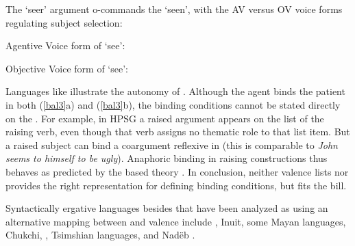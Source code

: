 \documentclass[output=paper
 	        ,biblatex
                ,babelshorthands
                ,newtxmath
                ,draftmode
                ,colorlinks, citecolor=brown
]{langscibook}
\begin{document}
\noindent
The `seer' argument o-commands the `seen', with the AV versus
OV voice forms regulating subject selection:

\begin{exe} 
	\label{avsee}
\ex	Agentive Voice form of `see': \\
\end{exe}

\begin{exe} 
	\label{ovsee}
\ex	Objective Voice form of `see': \\
\end{exe}

\noindent
Languages like  illustrate the autonomy of \argst.  Although the agent binds the
patient in both (\ref{bal3}a) and (\ref{bal3}b), the binding conditions cannot be stated directly on
the .  For example, in HPSG a raised
argument appears on the \argst list of the raising verb, even though that verb assigns no thematic
role to that list item.
But a raised subject can bind a coargument reflexive in  (this is comparable to
 \textit{John seems to himself to be ugly}).  Anaphoric binding in 
raising constructions thus behaves as predicted by the \argst based theory \citep{Wechsler1999}.  In
conclusion, neither valence lists nor \content provides the right representation for defining binding
conditions, but \argst fits the bill.


Syntactically ergative languages besides  that have been analyzed as using an
alternative mapping between \argst and valence include , Inuit, some Mayan languages,
Chukchi, , Tsimshian languages, and Nad{\"e}b \citep{Manning1996,Manning+Sag:1999}.
\end{document}
